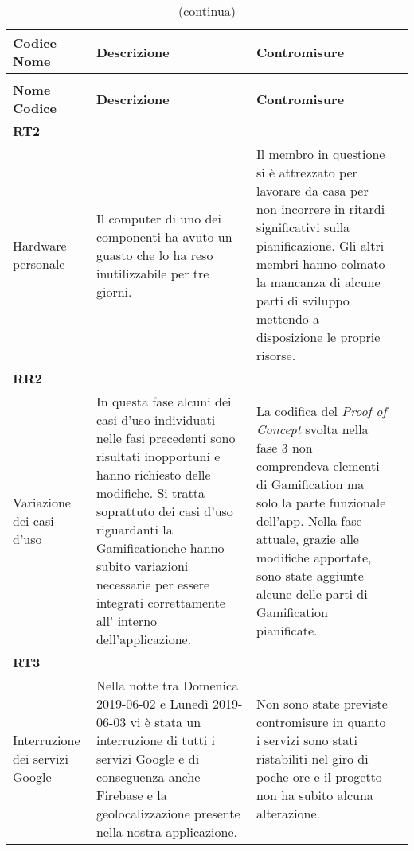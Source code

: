 \renewcommand{\arraystretch}{1.5}
\begin{longtable}{ 
		>{\centering}p{} 
		>{\raggedright}p{}
		>{\raggedright}p{} 
		>{\centering}p{}
	}
	
	
	\caption{Tabella attualizzazione rischi fase 4}\\
	\rowcolorhead
	\textbf{Codice \\ Nome} & \centering{}\textbf{Descrizione} & 
	\centering{}\textbf{Contromisure} 
	\tabularnewline
	\endfirsthead
	\rowcolor{white}\caption[]{(continua)}\\
	\rowcolorhead
	\textbf{Nome \\ Codice} & \centering{}\textbf{Descrizione} & 
	\centering{}\textbf{Contromisure} 
	\tabularnewline
	\endhead
	
	\textbf{RT2} \\ Hardware personale & 
	Il computer di uno dei componenti ha avuto un guasto che lo ha reso inutilizzabile per tre giorni. &
	Il membro in questione si è attrezzato per lavorare da casa per non incorrere in ritardi significativi sulla pianificazione. Gli altri membri hanno colmato la mancanza di alcune parti di sviluppo mettendo a disposizione le proprie risorse.
	\tabularnewline
	
	
	\textbf{RR2} \\ Variazione dei casi d'uso & 
	In questa fase alcuni dei casi d'uso individuati nelle fasi precedenti sono risultati inopportuni e hanno richiesto delle modifiche. Si tratta soprattuto dei casi d'uso riguardanti la Gamification\glosp che hanno subito variazioni necessarie per essere integrati correttamente all' interno dell'applicazione. &
	La codifica del \textit{Proof of Concept} svolta nella fase 3 non comprendeva elementi di Gamification ma solo la parte funzionale dell'app. Nella fase attuale, grazie alle modifiche apportate, sono state aggiunte alcune delle parti di Gamification pianificate.
	\tabularnewline
	
	\textbf{RT3} \\ Interruzione dei servizi Google & 
	Nella notte tra Domenica 2019-06-02 e Lunedì 2019-06-03 vi è stata un interruzione di tutti i servizi Google e di conseguenza anche Firebase e la geolocalizzazione presente nella nostra applicazione. &
	Non sono state previste contromisure in quanto i servizi sono stati ristabiliti nel giro di poche ore e il progetto non ha subito alcuna alterazione.
	\tabularnewline
	
	
\end{longtable}
\renewcommand{\arraystretch}{1}

